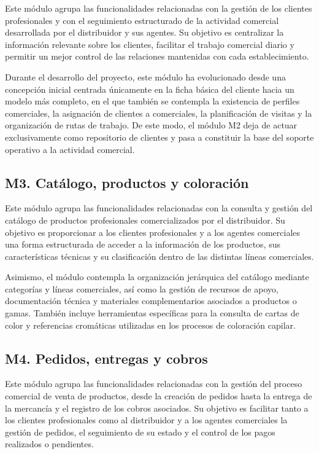 Este módulo agrupa las funcionalidades relacionadas con la gestión de los clientes profesionales y con el seguimiento estructurado de la actividad comercial desarrollada por el distribuidor y sus agentes. Su objetivo es centralizar la información relevante sobre los clientes, facilitar el trabajo comercial diario y permitir un mejor control de las relaciones mantenidas con cada establecimiento.

Durante el desarrollo del proyecto, este módulo ha evolucionado desde una concepción inicial centrada únicamente en la ficha básica del cliente hacia un modelo más completo, en el que también se contempla la existencia de perfiles comerciales, la asignación de clientes a comerciales, la planificación de visitas y la organización de rutas de trabajo. De este modo, el módulo M2 deja de actuar exclusivamente como repositorio de clientes y pasa a constituir la base del soporte operativo a la actividad comercial.

\subsection{M3. Catálogo, productos y coloración}

Este módulo agrupa las funcionalidades relacionadas con la consulta y gestión del catálogo de productos profesionales comercializados por el distribuidor. Su objetivo es proporcionar a los clientes profesionales y a los agentes comerciales una forma estructurada de acceder a la información de los productos, sus características técnicas y su clasificación dentro de las distintas líneas comerciales.

Asimismo, el módulo contempla la organización jerárquica del catálogo mediante categorías y líneas comerciales, así como la gestión de recursos de apoyo, documentación técnica y materiales complementarios asociados a productos o gamas. También incluye herramientas específicas para la consulta de cartas de color y referencias cromáticas utilizadas en los procesos de coloración capilar.

\subsection{M4. Pedidos, entregas y cobros}

Este módulo agrupa las funcionalidades relacionadas con la gestión del proceso comercial de venta de productos, desde la creación de pedidos hasta la entrega de la mercancía y el registro de los cobros asociados. Su objetivo es facilitar tanto a los clientes profesionales como al distribuidor y a los agentes comerciales la gestión de pedidos, el seguimiento de su estado y el control de los pagos realizados o pendientes.

